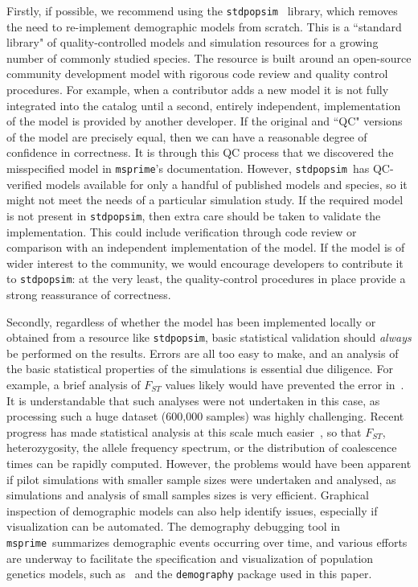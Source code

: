 \documentclass{article}
\newcommand{\msprime}[0]{\texttt{msprime}}
\newcommand{\stdpopsim}[0]{\texttt{stdpopsim}}
\begin{document}
Firstly, if possible, we recommend using the \stdpopsim~\citep{adrion2019community}
library, which removes the need to re-implement demographic models from scratch.
This is a ``standard library" of quality-controlled
models and simulation resources for a growing number of commonly studied species.
The resource is built around an open-source community development model
with rigorous code review and quality control procedures.
For example, when a contributor adds a new model it is not fully integrated
into the catalog until a second, entirely independent, implementation of the
model is provided by another developer. If the original and ``QC" versions
of the model are precisely equal, then we can have a reasonable degree
of confidence in correctness. It is through this QC process that we discovered
the misspecified model in \msprime's documentation.
However, \stdpopsim\ has QC-verified models available for only a handful of published
models and species, so it might not meet the needs of a particular simulation study.
If the required model is not present in \stdpopsim, then extra care should
be taken to validate the implementation.
This could include verification through code review or comparison with an
independent implementation of the model. If the model is of wider interest to
the community, we would encourage developers to contribute it to \stdpopsim:
at the very least, the quality-control procedures in place provide a strong
reassurance of correctness.

Secondly, regardless of whether the model has been implemented
locally or obtained from a resource like \stdpopsim,
basic statistical validation should \emph{always} be performed on the
results. Errors are all too easy to make, and an analysis of the
basic statistical properties of the simulations is essential
due diligence. For example, a brief analysis of $F_{ST}$ values
likely would have prevented the error in~\citet{martin2017human}.
It is understandable that such analyses were not undertaken in this
case, as processing such a huge dataset (600,000 samples) was
highly challenging. Recent progress has made statistical analysis at this scale much
easier~\citep{ralph2020efficiently}, so that $F_{ST}$,
heterozygosity, the allele frequency spectrum, or the distribution of coalescence
times can be rapidly computed. However, the problems would have been
apparent if pilot simulations with smaller sample sizes were undertaken and analysed,
as simulations and analysis of small samples sizes is very efficient.
Graphical inspection of demographic models can also help identify issues, especially if
visualization can be automated. The demography debugging tool in \msprime\
summarizes demographic events occurring over time, and various efforts are underway to facilitate
the specification and visualization of population genetics models, such as~\citet{zhou2018popdemog}
and the \texttt{demography} package used in this paper.
\end{document}
